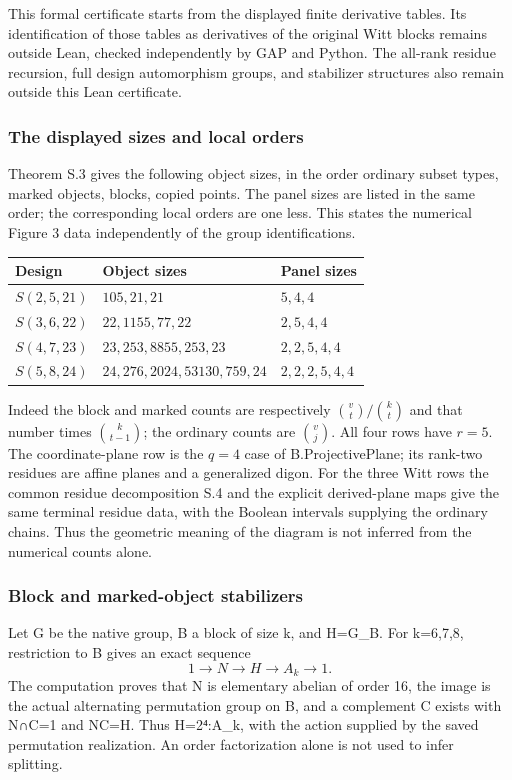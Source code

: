 This formal certificate starts from the displayed finite derivative
tables. Its identification of those tables as derivatives of the
original Witt blocks remains outside Lean, checked independently by GAP
and Python. The all-rank residue recursion, full design automorphism
groups, and stabilizer structures also remain outside this Lean
certificate.

\subsubsection{The displayed sizes and local orders}
Theorem S.3 gives the following object sizes, in the order ordinary
subset types, marked objects, blocks, copied points. The panel sizes
are listed in the same order; the corresponding local orders are one
less. This states the numerical Figure 3 data independently of the
group identifications.
\begin{center}\small
\begin{tabular}{lll}
\toprule
Design & Object sizes & Panel sizes\\
\midrule
$S(2,5,21)$ & $105,21,21$ & $5,4,4$\\
$S(3,6,22)$ & $22,1155,77,22$ & $2,5,4,4$\\
$S(4,7,23)$ & $23,253,8855,253,23$ & $2,2,5,4,4$\\
$S(5,8,24)$ & $24,276,2024,53130,759,24$ & $2,2,2,5,4,4$\\
\bottomrule
\end{tabular}
\end{center}
Indeed the block and marked counts are respectively
$\binom vt/\binom kt$ and that number times $\binom k{t-1}$;
the ordinary counts are $\binom vj$. All four rows have $r=5$.
The coordinate-plane row is the $q=4$ case of B.ProjectivePlane;
its rank-two residues are affine planes and a generalized digon.
For the three Witt rows the common residue decomposition S.4 and the
explicit derived-plane maps give the same terminal residue data,
with the Boolean intervals supplying the ordinary chains. Thus the
geometric meaning of the diagram is not inferred from the numerical
counts alone.

\subsubsection{Block and marked-object
stabilizers}\label{block-and-marked-object-stabilizers}

Let G be the native group, B a block of size k, and H=G\_B. For k=6,7,8,
restriction to B gives an exact sequence \[
1\longrightarrow N\longrightarrow H\longrightarrow A_k\longrightarrow1.
\] The computation proves that N is elementary abelian of order 16, the
image is the actual alternating permutation group on B, and a complement
C exists with N∩C=1 and NC=H. Thus H=2⁴:A\_k, with the action supplied
by the saved permutation realization. An order factorization alone is
not used to infer splitting.

